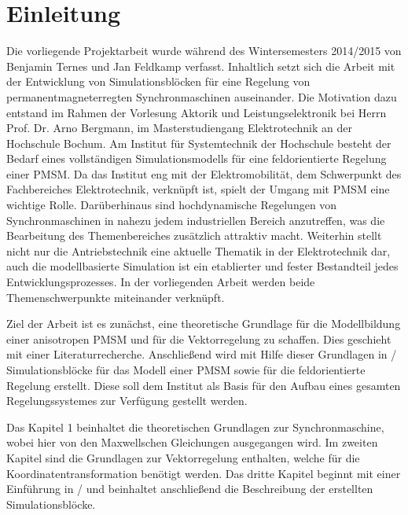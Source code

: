
\chapter*{Einleitung}
\label{cha:einleitung}

Die vorliegende Projektarbeit wurde während des Wintersemesters 2014/2015 von Benjamin Ternes und Jan Feldkamp verfasst.
Inhaltlich setzt sich die Arbeit mit der Entwicklung von Simulationsblöcken für eine Regelung von permanentmagneterregten Synchronmaschinen auseinander.
Die Motivation dazu entstand im Rahmen der Vorlesung \glqq Aktorik und Leistungselektronik\grqq{} bei Herrn Prof. Dr. Arno Bergmann, im Masterstudiengang Elektrotechnik an der Hochschule Bochum.
Am Institut für Systemtechnik der Hochschule besteht der Bedarf eines vollständigen Simulationsmodells für eine feldorientierte Regelung einer PMSM.
Da das Institut eng mit der Elektromobilität, dem Schwerpunkt des Fachbereiches Elektrotechnik, verknüpft ist, spielt der Umgang mit PMSM eine wichtige Rolle.
Darüberhinaus sind hochdynamische Regelungen von Synchronmaschinen in nahezu jedem industriellen Bereich anzutreffen, was die Bearbeitung des Themenbereiches zusätzlich attraktiv macht.
Weiterhin stellt nicht nur die Antriebstechnik eine aktuelle Thematik in der Elektrotechnik dar, auch die modellbasierte Simulation ist ein etablierter und fester Bestandteil jedes Entwicklungsprozesses.
In der vorliegenden Arbeit werden beide Themenschwerpunkte miteinander verknüpft.

Ziel der Arbeit ist es zunächst, eine theoretische Grundlage für die Modellbildung einer anisotropen PMSM und für die Vektorregelung zu schaffen.
Dies geschieht mit einer Literaturrecherche.
Anschließend wird mit Hilfe dieser Grundlagen in / Simulationsblöcke für das Modell einer PMSM sowie für die feldorientierte Regelung erstellt.
Diese soll dem Institut als Basis für den Aufbau eines gesamten Regelungssystemes zur Verfügung gestellt werden.

Das Kapitel 1 beinhaltet die theoretischen Grundlagen zur Synchronmaschine, wobei hier von den Maxwellschen Gleichungen ausgegangen wird.
Im zweiten Kapitel sind die Grundlagen zur Vektorregelung enthalten, welche für die Koordinatentransformation benötigt werden.
Das dritte Kapitel beginnt mit einer Einführung in / und beinhaltet anschließend die Beschreibung der erstellten Simulationsblöcke.


 

\cleardoublepage
